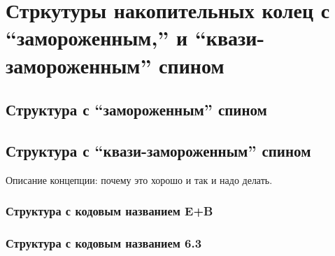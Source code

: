 \chapter{Стркутуры накопительных колец с ``замороженным,'' и ``квази-замороженным'' спином} \label{chapt2}

\section{Структура с ``замороженным'' спином} \label{sect2_1}

\section{Структура с ``квази-замороженным'' спином} \label{sect2_2}
Описание концепции: почему это хорошо и так и надо делать.
\subsection{Структура с кодовым названием E+B}

\subsection{Структура с кодовым названием 6.3}

